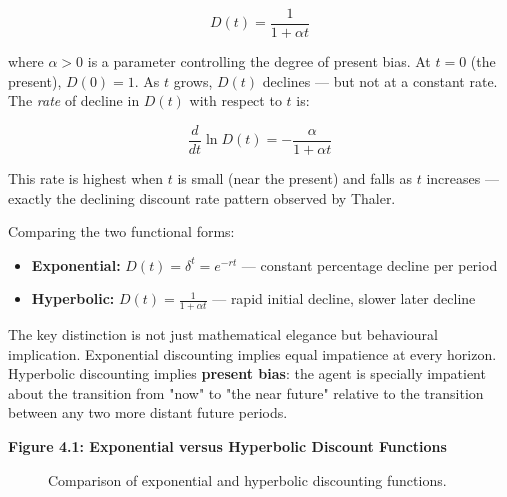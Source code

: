 \documentclass[12pt, letterpaper]{article}
\begin{document}
$$D(t) = \frac{1}{1 + \alpha t}$$

where $\alpha > 0$ is a parameter controlling the degree of present bias. At $t = 0$ (the present), $D(0) = 1$. As $t$ grows, $D(t)$ declines --- but not at a constant rate. The \textit{rate} of decline in $D(t)$ with respect to $t$ is:

$$\frac{d}{dt} \ln D(t) = -\frac{\alpha}{1 + \alpha t}$$

This rate is highest when $t$ is small (near the present) and falls as $t$ increases --- exactly the declining discount rate pattern observed by Thaler.

Comparing the two functional forms:
\begin{itemize}
\item \textbf{Exponential:} $D(t) = \delta^t = e^{-rt}$ --- constant percentage decline per period
\item \textbf{Hyperbolic:} $D(t) = \frac{1}{1+\alpha t}$ --- rapid initial decline, slower later decline
\end{itemize}

The key distinction is not just mathematical elegance but behavioural implication. Exponential discounting implies equal impatience at every horizon. Hyperbolic discounting implies \textbf{present bias}: the agent is specially impatient about the transition from "now" to "the near future" relative to the transition between any two more distant future periods.

\textbf{Figure 4.1: Exponential versus Hyperbolic Discount Functions}



\begin{figure}[ht]
\centering


\caption{Comparison of exponential and hyperbolic discounting functions.}

\end{figure}
\end{document}
